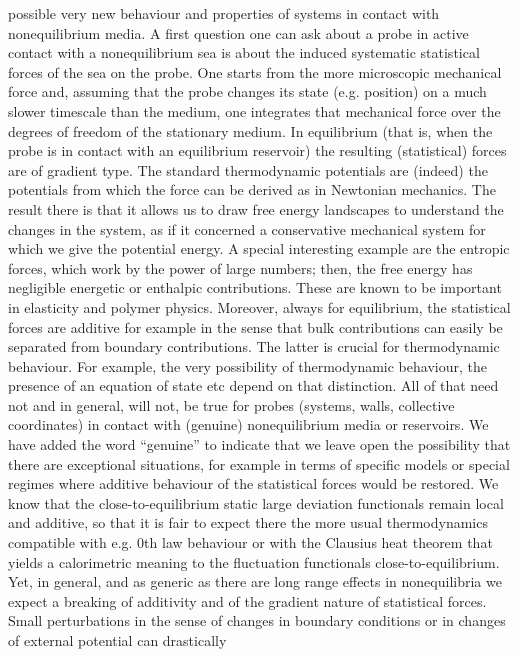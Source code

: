 possible very new behaviour and properties of systems in contact with nonequilibrium
media. A first question one can ask about a probe in active contact with a nonequilibrium
sea is about the induced systematic statistical forces of the sea on the probe.  One starts
from the more microscopic mechanical force and, assuming that the probe changes its state
(e.g. position) on a much slower timescale than the medium, one integrates that mechanical
force over the degrees of freedom of the stationary medium.  In equilibrium (that is, when
the probe is in contact with an equilibrium reservoir) the resulting (statistical) forces
are of gradient type.  The standard thermodynamic potentials are (indeed) the potentials
from which the force can be derived as in Newtonian mechanics. The result there is that it
allows us to draw free energy landscapes to understand the changes in the system, as if it
concerned a conservative mechanical system for which we give the potential energy.  A
special interesting example are the entropic forces, which work by the power of large
numbers; then, the free energy has negligible energetic or enthalpic contributions.  These
are known to be important in elasticity and polymer physics. Moreover, always for
equilibrium, the statistical forces are additive for example in the sense that bulk
contributions can easily be separated from boundary contributions.  The latter is crucial
for thermodynamic behaviour.  For example, the very possibility of thermodynamic behaviour,
the presence of an equation of state etc depend on that distinction.  All of that need not
and in general, will not,
be true for probes (systems, walls, collective coordinates) in contact with (genuine)
nonequilibrium media or reservoirs.  We have added the word “genuine” to indicate that we
leave open the possibility that there are exceptional situations, for example in terms of
specific models or special regimes where additive behaviour of the statistical forces would
be restored.  We know that the close-to-equilibrium static large deviation functionals
remain local and additive, so that it is fair to expect there the more usual thermodynamics
compatible with e.g. 0th law behaviour or with the Clausius heat theorem that yields a
calorimetric meaning to the fluctuation functionals close-to-equilibrium.  Yet, in general,
and as generic as there are long range effects in nonequilibria we expect a breaking of
additivity and of the gradient nature of statistical forces. Small perturbations in the
sense of changes in boundary conditions or in changes of external potential can drastically
